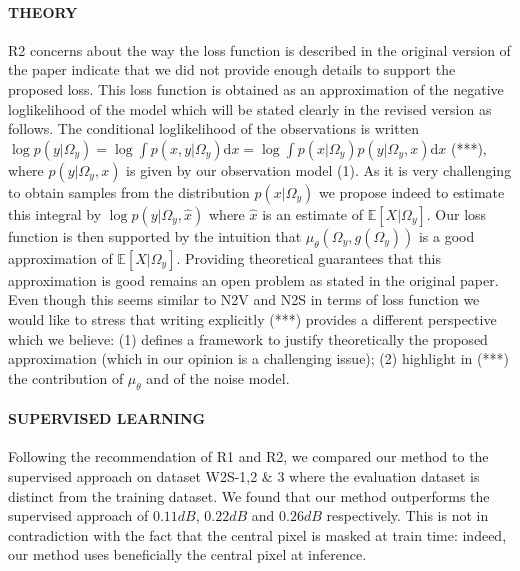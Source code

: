 \documentclass{article}
\begin{document}
\paragraph{THEORY}
R2 concerns about the way the loss function is described in the original version of the paper indicate that we did not provide enough details to support the proposed loss. This loss function is obtained as an approximation of the negative loglikelihood of the model which will be stated clearly in the revised version as follows.
The conditional loglikelihood of the observations is written $ \log p(y|\Omega_y) = \log \int p(x,y|\Omega_y) \mathrm{d}x = \log \int p(x|\Omega_y)p(y|\Omega_y,x) \mathrm{d}x$ (***), where $p(y|\Omega_y,x)$ is given by our observation model (1).
As it is very challenging to obtain samples from the distribution $p(x|\Omega_y)$ we propose indeed to estimate this integral by $\log p(y|\Omega_y,\hat {x})$ where $\hat {x}$ is an estimate of $\mathbb{E}[X|\Omega_y]$. Our loss function is then supported by the intuition that $\mu_\theta(\Omega_y,g(\Omega_y))$ is a good approximation of $\mathbb{E}[X|\Omega_y]$. Providing theoretical guarantees  that this approximation is good remains an open problem as stated in the original paper. Even though this seems similar to N2V and N2S in terms of loss function we would like to stress that writing explicitly (***) provides a different perspective which we believe:
(1) defines a framework to justify theoretically the proposed approximation (which in our opinion is a challenging issue); (2) highlight in (***) the contribution of $\mu_\theta$ and of the noise model.

\paragraph{SUPERVISED LEARNING}
Following the recommendation of R1 and R2, we compared our method to the supervised approach on dataset W2S-1,2 \& 3 where the evaluation dataset is distinct from the training dataset.
We found that our method outperforms the supervised approach of $0.11dB$, $0.22dB$ and $0.26dB$ respectively.
This is not in contradiction with the fact that the central pixel is masked at train time: indeed, our method uses beneficially the central pixel at inference.
\end{document}
